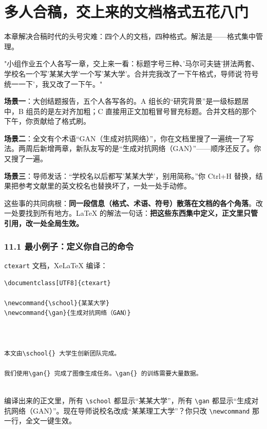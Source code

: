 \chapter{多人合稿，交上来的文档格式五花八门}

\begin{notebox}
本章解决合稿时代的头号灾难：四个人的文档，四种格式。解法是——格式集中管理。
\end{notebox}


"小组作业五个人各写一章，交上来一看：标题字号三种、'马尔可夫链'拼法两套、学校名一个写'某某大学'一个写'某大学'。合并完我改了一下午格式，导师说'符号统一一下'，我又改了一下午。"


\textbf{场景一}：大创结题报告，五个人各写各的。A 组长的“研究背景”是一级标题居中，B 组员的是左对齐加粗；C 直接用正文加粗冒号冒充标题。合并文档的那个下午，你贡献给了格式刷。

\textbf{场景二}：全文有个术语“GAN（生成对抗网络）”，你在文档里搜了一遍统一了写法。两周后新增两章，新队友写的是“生成对抗网络（GAN）”——顺序还反了。你又搜了一遍。

\textbf{场景三}：导师发话：“学校名以后都写'某某大学'，别用简称。”你 Ctrl+H 替换，结果把参考文献里的英文校名也替换坏了，一处一处手动修。

这些事的共同病根：\textbf{同一段信息（格式、术语、符号）散落在文档的各个角落}。改一处要找到所有地方。LaTeX 的解法一句话：\textbf{把这些东西集中定义，正文里只管引用，改一处全局生效。}


\subsection*{11.1 最小例子：定义你自己的命令}

\texttt{ctexart} 文档，XeLaTeX 编译：

\begin{lstlisting}
\documentclass[UTF8]{ctexart}

\newcommand{\school}{某某大学}
\newcommand{\gan}{生成对抗网络（GAN）}



本文由\school{} 大学生创新团队完成。

我们使用\gan{} 完成了图像生成任务。\gan{} 的训练需要大量数据。


\end{lstlisting}

编译出来的正文里，所有 \texttt{\textbackslash{}school} 都显示“某某大学”，所有 \texttt{\textbackslash{}gan} 都显示“生成对抗网络（GAN）”。现在导师说校名改成“某某理工大学”？你只改 \texttt{\textbackslash{}newcommand} 那一行，全文一键生效。


